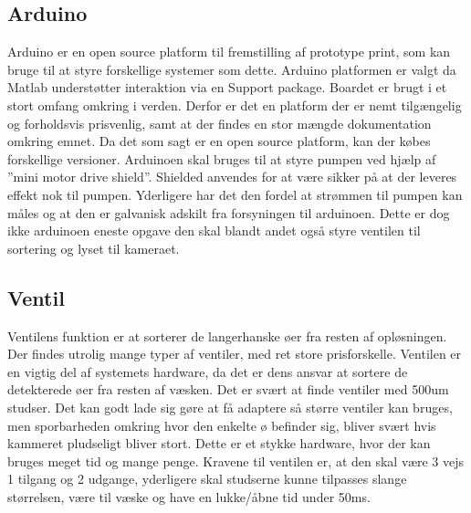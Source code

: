 \subsection{Arduino}
Arduino er en open source platform til fremstilling af prototype print, som kan bruge til at styre forskellige systemer som dette. Arduino platformen er valgt da Matlab understøtter interaktion via en Support package. Boardet er brugt i et stort omfang omkring i verden. Derfor er det en platform der er nemt tilgængelig og forholdsvis prisvenlig, samt at der findes en stor mængde dokumentation omkring emnet. Da det som sagt er en open source platform, kan der købes forskellige versioner. 
Arduinoen skal bruges til at styre pumpen ved hjælp af ”mini motor drive shield”. Shielded anvendes for at være sikker på at der leveres effekt nok til pumpen. Yderligere har det den fordel at strømmen til pumpen kan måles og at den er galvanisk adskilt fra forsyningen til arduinoen. Dette er dog ikke arduinoen eneste opgave den skal blandt andet også styre ventilen til sortering og lyset til kameraet.


\subsection{Ventil}
Ventilens funktion er at sorterer de langerhanske øer fra resten af opløsningen. Der findes utrolig mange typer af ventiler, med ret store prisforskelle. Ventilen er en vigtig del af systemets hardware, da det er dens ansvar at sortere de detekterede øer fra resten af væsken. Det er svært at finde ventiler med 500um studser. Det kan godt lade sig gøre at få adaptere så større ventiler kan bruges, men sporbarheden omkring hvor den enkelte ø befinder sig, bliver svært hvis kammeret pludseligt bliver stort. Dette er et stykke hardware, hvor der kan bruges meget tid og mange penge.
Kravene til ventilen er, at den skal være 3 vejs 1 tilgang og 2 udgange, yderligere skal studserne kunne tilpasses slange størrelsen, være til væske og have en lukke/åbne tid under 50ms.

